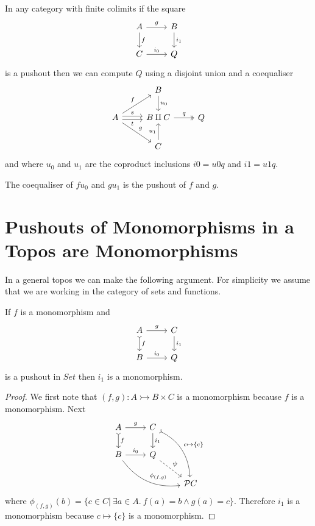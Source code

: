 \documentclass{article}
\begin{document}
In any category with finite colimits if the square
\begin{equation*}
  \begin{tikzcd}
   A \rar{g} \dar{f} & B\dar{i_1}\\
   C \rar{i_0} & Q
  \end{tikzcd}
\end{equation*}
is a pushout then we can compute $Q$ using a disjoint union and a coequaliser
\begin{equation*}
  \begin{tikzcd}
   {} & B \dar{u_0} & {}\\
   A \urar{f} \drar{g} \rar[yshift=0.5ex]{s} \rar[yshift=-0.5ex][swap]{t} & B\amalg C \rar[twoheadrightarrow]{q} & Q\\
   {} & C \uar{u_1} & {}
  \end{tikzcd}
\end{equation*}
and where $u_0$ and $u_1$ are the coproduct inclusions $i0=u0 q$ and $i1= u1 q$.

\begin{proposition}
  The coequaliser of $fu_0$ and $gu_1$ is the pushout of $f$ and $g$.
\end{proposition}

\section{Pushouts of Monomorphisms in a Topos are Monomorphisms}
\label{sec:pushouts-of-monomorphisms-are-monomorphisms}

In a general topos we can make the following argument.
For simplicity we assume that we are working in the category of sets and functions.

\begin{lemma}\label{lem:pushout-of-mono}
  If $f$ is a monomorphism and
  \begin{equation*}
    \begin{tikzcd}
     A \rar{g} \dar[rightarrowtail]{f} & C\dar{i_1}\\
     B \rar{i_0} & Q
    \end{tikzcd}
  \end{equation*}
  is a pushout in $Set$ then $i_1$ is a monomorphism.
  \begin{proof}
    We first note that $(f,g):A \rightarrowtail B\times C$ is a monomorphism because $f$ is a monomorphism.
    Next
    \begin{equation*}
      \begin{tikzcd}
       A \rar{g} \dar[rightarrowtail]{f} & C\dar{i_1} \arrow[bend left,rightarrowtail]{ddr}{c\mapsto \{c\}} & {}\\
       B \rar{i_0} \arrow[bend right]{rrd}{\phi_{(f,g)}} & Q \drar[dashed]{\psi} & {}\\
       {} & {} & \mathcal P C
      \end{tikzcd}
    \end{equation*}
    where $\phi_{(f,g)}(b)=\{c\in C|~\exists a\in A.~f(a)=b \wedge g(a)=c\}$.
    Therefore $i_1$ is a monomorphism because $c\mapsto \{c\}$ is a monomorphism.
  \end{proof}
\end{lemma}



\end{document}
